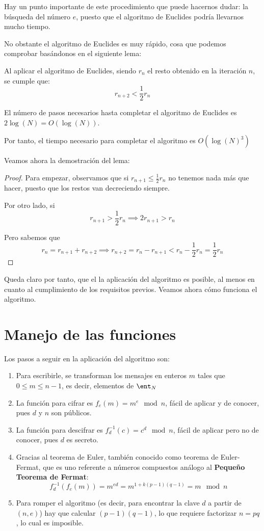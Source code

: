 Hay un punto importante de este procedimiento que puede hacernos dudar: la búsqueda del número $e$, puesto que el algoritmo de Euclides podría llevarnos mucho tiempo.

No obstante el algoritmo de Euclides es muy rápido, cosa que podemos comprobar basándonos en el siguiente lema:
\begin{lemma}
Al aplicar el algoritmo de Euclides, siendo $r_n$ el resto obtenido en la iteración $n$, se cumple que:
\[r_{n+2} < \frac{1}{2}r_n\]
\end{lemma}
\begin{corol}
El número de pasos necesarios hasta completar el algoritmo de Euclides es $2\log(N)=O(\log(N))$.

Por tanto, el tiempo necesario para completar el algoritmo es $O(\log(N)^3)$
\end{corol}

Veamos ahora la demostración del lema:
\begin{proof}
Para empezar, observamos que si $r_{n+1} \leq \frac{1}{2}r_n$ no tenemos nada más que hacer, puesto que los restos van decreciendo siempre.

Por otro lado, si
\[r_{n+1} > \frac{1}{2} r_n \implies 2r_{n+1} > r_n\]

Pero sabemos que
\[r_n = r_{n+1} + r_{n+2} \implies r_{n+2} = r_n-r_{n+1} < r_n-\frac{1}{2}r_n = \frac{1}{2}r_n\]
\end{proof}

Queda claro por tanto, que el la aplicación del algoritmo es posible, al menos en cuanto al cumplimiento de los requisitos previos. Veamos ahora cómo funciona el algoritmo.

\section{Manejo de las funciones}

Los pasos a seguir en la aplicación del algoritmo son:
\begin{enumerate}
\item Para escribirle, se transforman los mensajes en enteros $m$ tales que $0 \leq m \leq n-1$, es decir, elementos de $\ent_N$

\item La función para cifrar es $f_e(m)=m^e \mod n$, fácil de aplicar y de conocer, pues $d$ y $n$ son públicos.

\item La función para descifrar es $f_d^{-1}(c)=c^d \mod n$, fácil de aplicar pero no de conocer, pues $d$ es secreto.

\item Gracias al teorema de Euler, también conocido como teorema de Euler-Fermat, que es uno referente a números compuestos análogo al \textbf{Pequeño Teorema de Fermat}:
\[f_d^{-1}(f_e(m)) = m^{ed} = m^{1+k(p-1)(q-1)} = m \mod n\]

\item Para romper el algoritmo (es decir, para encontrar la clave $d$ a partir de $(n,e)$) hay que calcular $(p-1)(q-1)$, lo que requiere factorizar $n=pq$, lo cual es imposible.

\end{enumerate}

